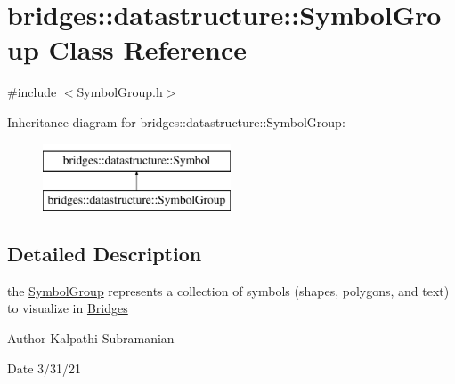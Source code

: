 \hypertarget{classbridges_1_1datastructure_1_1_symbol_group}{}\section{bridges\+:\+:datastructure\+:\+:Symbol\+Group Class Reference}
\label{classbridges_1_1datastructure_1_1_symbol_group}


{\ttfamily \#include $<$Symbol\+Group.\+h$>$}

Inheritance diagram for bridges\+:\+:datastructure\+:\+:Symbol\+Group\+:\begin{figure}[H]
\begin{center}
\leavevmode
\includegraphics[height=2.000000cm]{classbridges_1_1datastructure_1_1_symbol_group}
\end{center}
\end{figure}


\subsection{Detailed Description}
the \hyperlink{classbridges_1_1datastructure_1_1_symbol_group}{Symbol\+Group} represents a collection of symbols (shapes, polygons, and text) to visualize in \hyperlink{classbridges_1_1_bridges}{Bridges} 

\begin{DoxyAuthor}{Author}
Kalpathi Subramanian 
\end{DoxyAuthor}
\begin{DoxyDate}{Date}
3/31/21 
\end{DoxyDate}

